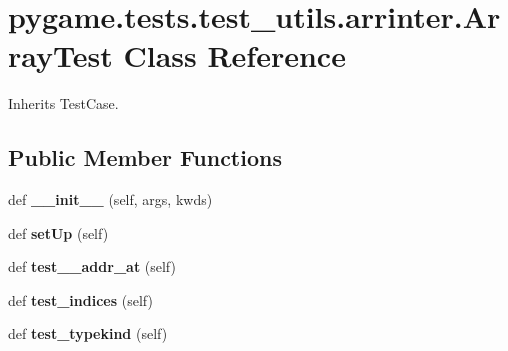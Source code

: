 \hypertarget{classpygame_1_1tests_1_1test__utils_1_1arrinter_1_1_array_test}{}\section{pygame.\+tests.\+test\+\_\+utils.\+arrinter.\+Array\+Test Class Reference}
\label{classpygame_1_1tests_1_1test__utils_1_1arrinter_1_1_array_test}


Inherits Test\+Case.

\subsection*{Public Member Functions}
\begin{DoxyCompactItemize}
\item 
\mbox{\label{classpygame_1_1tests_1_1test__utils_1_1arrinter_1_1_array_test_aefd09ba710d75651f7c6746503d799a7}} 
def {\bfseries \+\_\+\+\_\+init\+\_\+\+\_\+} (self, args, kwds)
\item 
\mbox{\label{classpygame_1_1tests_1_1test__utils_1_1arrinter_1_1_array_test_a18c38c855e88a125f6ca0cf3db5afef9}} 
def {\bfseries set\+Up} (self)
\item 
\mbox{\label{classpygame_1_1tests_1_1test__utils_1_1arrinter_1_1_array_test_af18cf4238ea7939721cc9674dd7ec549}} 
def {\bfseries test\+\_\+\+\_\+addr\+\_\+at} (self)
\item 
\mbox{\label{classpygame_1_1tests_1_1test__utils_1_1arrinter_1_1_array_test_a52dd488376ab68b9963ed098a7253ca4}} 
def {\bfseries test\+\_\+indices} (self)
\item 
\mbox{\label{classpygame_1_1tests_1_1test__utils_1_1arrinter_1_1_array_test_af6293d3907b89a7948198078573a3602}} 
def {\bfseries test\+\_\+typekind} (self)
\item 
\mbox{\label{classpygame_1_1tests_1_1test__utils_1_1arrinter_1_1_array_test_a65505e4dccde15bc70c7826afd19c3c1}} 

\end{DoxyCompactItemize}
